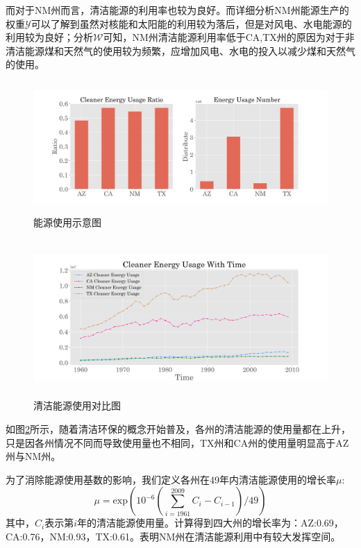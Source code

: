 \documentclass[13pt]{ctexart}
\begin{document}
而对于NM州而言，清洁能源的利用率也较为良好。而详细分析NM州能源生产的权重$\mathcal{Y}$可以了解到虽然对核能和太阳能的利用较为落后，但是对风电、水电能源的利用较为良好；分析$\mathcal{W}$可知，NM州清洁能源利用率低于CA,TX州的原因为对于非清洁能源煤和天然气的使用较为频繁，应增加风电、水电的投入以减少煤和天然气的使用。
\begin {figure}[h]
	\centering %
	\includegraphics[width=15cm,height=5cm]{2.png}
	\caption{能源使用示意图} %
	\label{pic2}
\end {figure}


\begin {figure}[h]
	\centering %
	\includegraphics[width=13cm,height=6cm]{3.png}
	\caption{清洁能源使用对比图} %
\label{pic3}
\end {figure}

如图\ref{pic3}所示，随着清洁环保的概念开始普及，各州的清洁能源的使用量都在上升，只是因各州情况不同而导致使用量也不相同，TX州和CA州的使用量明显高于AZ州与NM州。

为了消除能源使用基数的影响，我们定义各州在49年内清洁能源使用的增长率$\mu$:
\begin{equation}
	\mu = \mathrm{exp}(10^{-6}(\textstyle{\sum_{i=1961}^{2009}C_{i}-C_{i-1}})/49)
	\label{ratio}
\end{equation}
其中，$C_{i}$表示第$i$年的清洁能源使用量。计算得到四大州的增长率为：AZ:0.69，CA:0.76，NM:0.93，TX:0.61。表明NM州在清洁能源利用中有较大发挥空间。
\end{document}
